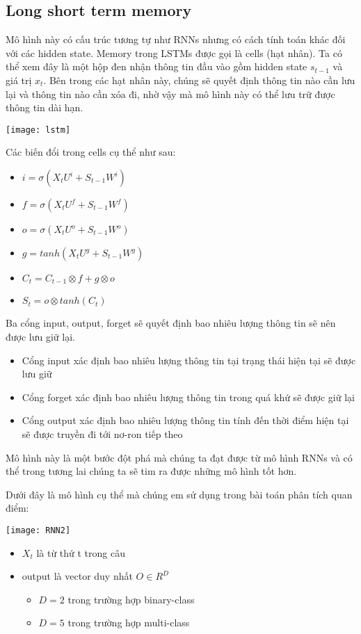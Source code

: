\subsection{Long short term memory}
Mô hình này có cấu trúc tương tự như RNNs nhưng có cách tính toán khác đối với các hidden state. Memory trong LSTMs được gọi là cells (hạt nhân). Ta có thể xem đây là một hộp đen nhận thông tin đầu vào gồm hidden state $s_{t-1}$ và giá trị $x_t$. Bên trong các hạt nhân này, chúng sẽ quyết định thông tin nào cần lưu lại và thông tin nào cần xóa đi, nhờ vậy mà mô hình này có thể lưu trữ được thông tin dài hạn.
	\begin{center}
	  \texttt{[image: lstm]}
	  \label{lstm}
	\end{center}
Các biến đổi trong cells cụ thể như sau:
	\begin{itemize}[label = \textbullet]
		\item $i = \sigma(X_tU^i + S_{t-1}W^i)$
		\item $f = \sigma(X_tU^f + S_{t-1}W^f)$ 
		\item $o = \sigma(X_tU^o + S_{t-1}W^o)$
		\item $g = tanh(X_tU^g + S_{t-1}W^g)$
		\item $C_t = C_{t-1} \otimes f + g \otimes o$
		\item $S_t = o \otimes tanh(C_t)$
	\end{itemize}
Ba cổng input, output, forget sẽ quyết định bao nhiêu lượng thông tin sẽ nên được lưu giữ lại. 
	\begin{itemize}[label = \textbullet]
		\item Cổng input xác định bao nhiêu lượng thông tin tại trạng thái hiện tại sẽ được lưu giữ
		\item Cổng forget xác định bao nhiêu lượng thông tin trong quá khứ sẽ được giữ lại
		\item Cổng output xác định bao nhiêu lượng thông tin tính đến thời điểm hiện tại sẽ được truyền đi tới nơ-ron tiếp theo
	\end{itemize} 
Mô hình này là một bước đột phá mà chúng ta đạt được từ mô hình RNNs và có thể trong tương lai chúng ta sẽ tim ra được những mô hình tốt hơn.

Dưới đây là mô hình cụ thể mà chúng em sử dụng trong bài toán phân tích quan điểm: 
	\begin{center}
	  \texttt{[image: RNN2]}
	  \label{rnns2}
	\end{center}
	\begin{itemize}[label = \textbullet]
		\item $X_t$ là từ thứ t trong câu
		\item output là vector duy nhất $O \in R ^{D}$
		\begin{itemize}[label = \textendash]
			\item $D = 2$ trong trường hợp binary-class
			\item $D = 5$ trong trường hợp multi-class
		\end{itemize} 		
	\end{itemize}